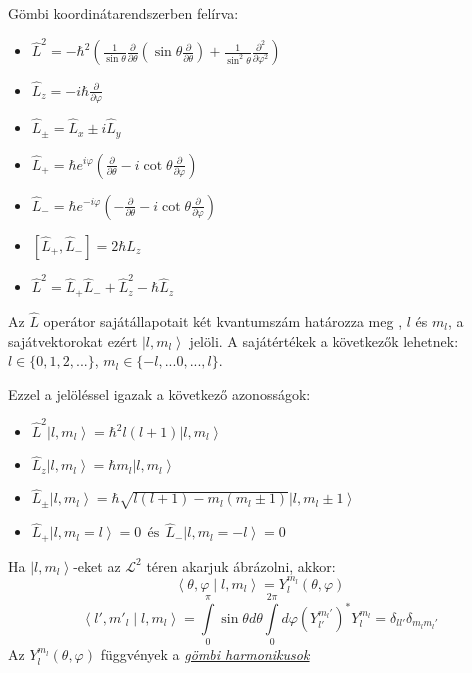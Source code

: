 \documentclass[12pt]{article}
\theoremstyle{plain}
\newcommand{\ndurl}[2]{\textit{\href{#1}{\underline{#2}}}}
\newcommand{\ket}[1]{\left| #1 \right >}
\newcommand{\bracket}[2]{\left < #1 \middle | #2 \right>}
\newcommand{\commut}[2]{\left [ #1 , #2 \right]}
\begin{document}
Gömbi koordinátarendszerben felírva:
\begin{itemize}
    \item $
        \hat L^2 = -\hbar^2 \left(\frac{1}{\sin \theta} \frac{\partial}{\partial \theta} \left(\sin\theta\frac{\partial}{\partial \theta}\right) 
        + \frac{1}{\sin^2 \theta}\frac{\partial^2}{\partial\varphi^2}\right)
    $
    \item $
        \hat L_z = -i\hbar \frac{\partial}{\partial\varphi}
    $
    \item $
      \hat L_{\pm} = \hat L_x \pm i \hat L_y
    $
    \item $
        \hat L_+ = \hbar e^{i\varphi} \left( \frac{\partial}{\partial \theta} - i \cot\theta \frac{\partial}{\partial \varphi}\right)
    $
    \item $
        \hat L_- = \hbar e^{-i\varphi} \left( - \frac{\partial}{\partial \theta} - i \cot\theta \frac{\partial}{\partial \varphi}\right)
    $
    \item $
        \commut{\hat L_+}{\hat L_-} = 2 \hbar L_z
    $
    \item $
        \hat L^2 = \hat L_+ \hat L_- + \hat L_z^2 - \hbar \hat L_z
    $
\end{itemize}
Az $\hat L$ operátor sajátállapotait két kvantumszám határozza meg , $l$ és $m_l$, a sajátvektorokat ezért $\ket{l,m_l}$ jelöli.
A sajátértékek a következők lehetnek: $l\in \{0,1,2, ...\}$, $m_l \in \{-l,... 0, ..., l\}$.

Ezzel a jelöléssel igazak a következő azonosságok:
\begin{itemize}
    \item $
        \hat L^2 \ket{l, m_l} = \hbar^2 l (l+1) \ket{l,m_l}
    $
    \item $
        \hat L_z \ket{l, m_l} = \hbar m_l \ket{l,m_l}
    $
    \item $
      \hat L_{\pm}\ket{l, m_l} = \hbar \sqrt{l(l+1) - m_l(m_l\pm1)}\ket{l,m_l\pm 1}
    $
    \item $
        \hat L_+ \ket{l,m_l=l} = 0 ~~ \textrm{és} ~~ \hat L_- \ket{l,m_l=-l} = 0
    $
\end{itemize}
Ha $\ket{l,m_l}$-eket az $\mathcal{L}^2$ téren akarjuk ábrázolni, akkor:
\[
    \bracket{\theta, \varphi}{l,m_l} = Y^{m_l}_l(\theta, \varphi)
\]
\[
   \bracket{l',m'_l}{l,m_l} = \int \limits_0^{\pi}\sin\theta d \theta \int \limits_0^{2\pi}d \varphi (Y^{m_l'}_{l'})^{*} Y^{m_l}_l = \delta_{ll'}\delta_{m_lm_l'}
\]
Az $Y^{m_l}_l(\theta, \varphi)$ függvények a \ndurl{https://en.wikipedia.org/wiki/Spherical_harmonics}{gömbi harmonikusok}
\end{document}
